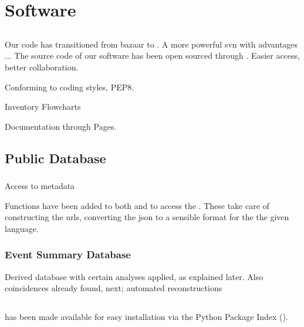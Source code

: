 \chapter{Software}
\label{ch:software}

\section{\github}

Our code has transitioned from bazaar to \git. A more powerful svn with
advantages ... The source code of our software has been open sourced
through \github. Easier access, better collaboration.

Conforming to coding styles, PEP8.

Inventory
Flowcharts

Documentation through \github Pages.


\section{\hisparc Public Database}

\subsection{\api}

Access to metadata

Functions have been added to both \sapphire and \jsparc to access the
\api. These take care of constructing the urls, converting the json to a
sensible format for the the given language.


\subsection{Event Summary Database}

Derived database with certain analyses applied, as explained later. Also
coincidences already found, next; automated reconstructions


\section{\sapphire}


\subsection{\pypi}

\sapphire has been made available for easy installation via the Python
Package Index (\pypi).


